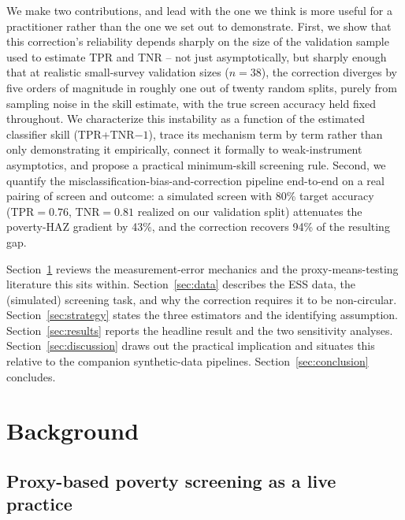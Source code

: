 \documentclass[12pt]{article}
\begin{document}
We make two contributions, and lead with the one we think is more useful for a practitioner rather than the one we set out to demonstrate. First, we show that this correction's reliability depends sharply on the size of the validation sample used to estimate TPR and TNR -- not just asymptotically, but sharply enough that at realistic small-survey validation sizes ($n=38$), the correction diverges by five orders of magnitude in roughly one out of twenty random splits, purely from sampling noise in the skill estimate, with the true screen accuracy held fixed throughout. We characterize this instability as a function of the estimated classifier skill (TPR+TNR$-1$), trace its mechanism term by term rather than only demonstrating it empirically, connect it formally to weak-instrument asymptotics, and propose a practical minimum-skill screening rule. Second, we quantify the misclassification-bias-and-correction pipeline end-to-end on a real pairing of screen and outcome: a simulated screen with 80\% target accuracy (TPR$=0.76$, TNR$=0.81$ realized on our validation split) attenuates the poverty-HAZ gradient by 43\%, and the correction recovers 94\% of the resulting gap.

Section~\ref{sec:background} reviews the measurement-error mechanics and the proxy-means-testing literature this sits within. Section~\ref{sec:data} describes the ESS data, the (simulated) screening task, and why the correction requires it to be non-circular. Section~\ref{sec:strategy} states the three estimators and the identifying assumption. Section~\ref{sec:results} reports the headline result and the two sensitivity analyses. Section~\ref{sec:discussion} draws out the practical implication and situates this relative to the companion synthetic-data pipelines. Section~\ref{sec:conclusion} concludes.

\section{Background}
\label{sec:background}

\subsection{Proxy-based poverty screening as a live practice}
\end{document}
